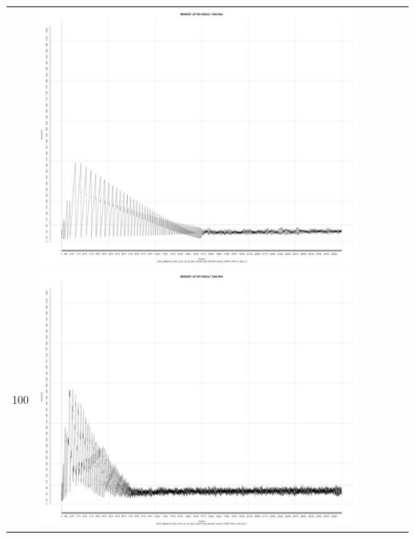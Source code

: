 \begin{table}[htbp]
{\begin{tabular}{l | ccccc}
\begin{minipage}{.15\textwidth}
    				\end{minipage}
    			   & \begin{minipage}{.15\textwidth}\vspace{2pt}     							
     			 	\includegraphics[width=\linewidth]{images/mema-triple/N6}
    				 \end{minipage}\\		
		100	   & \begin{minipage}{.15\textwidth}\vspace{2pt}     							
     			 	\includegraphics[width=\linewidth]{images/mema-triple/N3}
    				 \end{minipage}

\end{tabular}}
\end{table}
